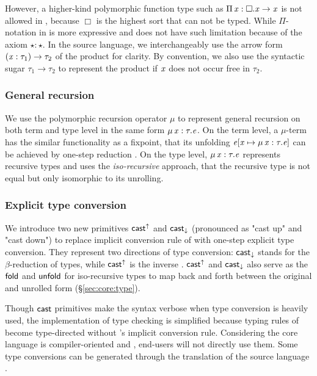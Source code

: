 However, a higher-kind polymorphic function type such as $\Pi \, \mathit{x}  :  \Box  .  \mathit{x}  \rightarrow  \mathit{x}$ is not allowed in \cc, because $\Box$ is the highest sort that can not be typed. While $ \Pi $-notation in \name is more expressive and does not have such limitation because of the axiom $\star:\star$. In the source language, we interchangeably use the arrow form $(  \mathit{x}  :  \tau_{{\mathrm{1}}}  )  \rightarrow  \tau_{{\mathrm{2}}}$ of the product for clarity. By convention, we also use the syntactic sugar $\tau_{{\mathrm{1}}}  \longrightarrow  \tau_{{\mathrm{2}}}$ to represent the product if $\mathit{x}$ does not occur free in $\tau_{{\mathrm{2}}}$.

\subsubsection{General recursion}
We use the polymorphic recursion operator $ \mu $ to represent general recursion on both term and type level in the same form $\mu \, \mathit{x}  :  \tau  .  \mathit{e}$. On the term level, a $ \mu $-term has the similar functionality as a fixpoint, that its unfolding $\mathit{e}  [  \mathit{x}  \mapsto  \mu \, \mathit{x}  :  \tau  .  \mathit{e}  ]$ can be achieved by one-step reduction . On the type level, $\mu \, \mathit{x}  :  \tau  .  \mathit{e}$ represents recursive types and uses the \emph{iso-recursive} approach, that the recursive type is not equal but only isomorphic to its unrolling.

\subsubsection{Explicit type conversion}
We introduce two new primitives $ \mathsf{cast}^{\uparrow} $ and $ \mathsf{cast}_{\downarrow} $ (pronounced as "cast up" and "cast down") to replace implicit conversion rule of \cc with one-step explicit type conversion. They represent two directions of type conversion: $ \mathsf{cast}_{\downarrow} $ stands for the $\beta$-reduction of types, while $ \mathsf{cast}^{\uparrow} $ is the inverse . $ \mathsf{cast}^{\uparrow} $ and $ \mathsf{cast}_{\downarrow} $ also serve as the $\mathsf{fold}$ and $\mathsf{unfold}$ for iso-recursive types to map back and forth between the original and unrolled form (\S \ref{sec:core:type}).

Though $\mathsf{cast}$ primitives make the syntax verbose when type conversion is heavily used, the implementation of type checking is simplified because typing rules of \name become type-directed without \cc's implicit conversion rule. Considering the core language is compiler-oriented and , end-users will not directly use them. Some type conversions can be generated through the translation of the source language \fixme{(\S \ref{sec:src})}.


